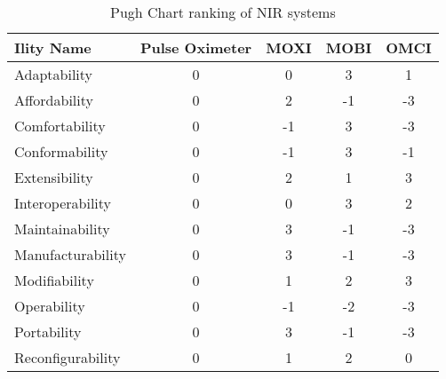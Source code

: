 \begin{table}
\centering
\caption{Pugh Chart ranking of NIR systems}
\label{tab:pughtable}
\begin{tabular}{@{}lcccc@{}}
\toprule
Ility Name        & Pulse Oximeter & MOXI & MOBI & OMCI \\ \midrule
Adaptability      & 0              & 0    & 3    & 1    \\
Affordability     & 0              & 2    & -1   & -3   \\
Comfortability    & 0              & -1   & 3    & -3   \\
Conformability    & 0              & -1   & 3    & -1   \\
Extensibility     & 0              & 2    & 1    & 3    \\
Interoperability  & 0              & 0    & 3    & 2    \\
Maintainability   & 0              & 3    & -1   & -3   \\
Manufacturability & 0              & 3    & -1   & -3   \\
Modifiability     & 0              & 1    & 2    & 3    \\
Operability       & 0              & -1   & -2   & -3   \\
Portability       & 0              & 3    & -1   & -3   \\
Reconfigurability & 0              & 1    & 2    & 0    \\ \bottomrule
\end{tabular}%
\end{table}


